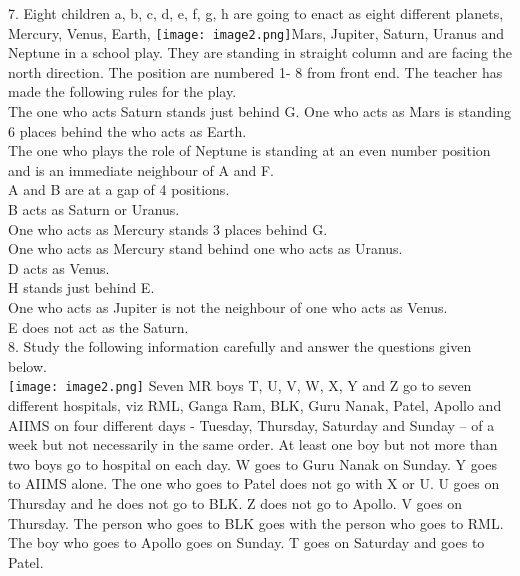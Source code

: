 \documentclass[
]{article}
\begin{document}
7. Eight children a, b, c, d, e, f, g, h are going to enact as eight different planets, Mercury,
Venus, Earth, \texttt{[image: image2.png]}Mars, Jupiter, Saturn, Uranus and Neptune in a school play. They are
standing in straight column and are facing the north direction. The position are numbered 1-
8 from front end. The teacher has made the following rules for the play.\\
The one who acts Saturn stands just behind G.
One who acts as Mars is standing 6 places behind the who acts as Earth.\\
The one who plays the role of Neptune is standing at an even number position and is an
immediate neighbour of A and F.\\
A and B are at a gap of 4 positions.\\
B acts as Saturn or Uranus.\\
One who acts as Mercury stands 3 places behind G.\\
One who acts as Mercury stand behind one who acts as Uranus.\\
D acts as Venus.\\
H stands just behind E.\\
One who acts as Jupiter is not the neighbour of one who acts as Venus.\\
E does not act as the Saturn.\\

8. Study the following information carefully and answer the questions given below.\\
\texttt{[image: image2.png]}
Seven MR boys T, U, V, W, X, Y and Z go to seven different hospitals, viz RML, Ganga Ram,
BLK, Guru Nanak, Patel, Apollo and AIIMS on four different days - Tuesday, Thursday,
Saturday and Sunday – of a week but not necessarily in the same order. At least one boy but
not more than two boys go to hospital on each day. W goes to Guru Nanak on Sunday. Y
goes to AIIMS alone. The one who goes to Patel does not go with X or U. U goes on
Thursday and he does not go to BLK. Z does not go to Apollo. V goes on Thursday. The
person who goes to BLK goes with the person who goes to RML. The boy who goes to
Apollo goes on Sunday. T goes on Saturday and goes to Patel.\\
\end{document}
